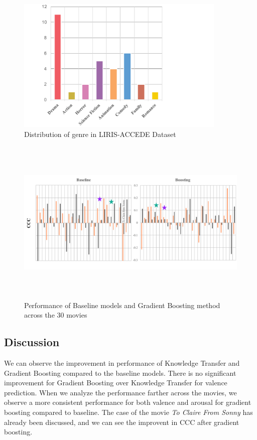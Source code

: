 \documentclass{article}
\begin{document}
\begin{figure}[h]
\includegraphics[width=10cm]{genre}
\centering
\caption{Distribution of genre in LIRIS-ACCEDE Dataset}
\label{genre}
\end{figure}

\begin{figure}[h]
\includegraphics[width=\textwidth, height = 8cm]{comparison}
\centering
\caption{Performance of Baseline models and Gradient Boosting method across the 30 movies}
\label{comparison}
\end{figure}

\subsection{Discussion}
We can observe the improvement in performance of Knowledge Transfer and Gradient Boosting compared to the baseline models. There is no significant improvement for Gradient Boosting over Knowledge Transfer for valence prediction. When we analyze the performance farther across the movies, we observe a more consistent performance for both valence and arousal for gradient boosting compared to baseline. The case of the movie \textit{To Claire From Sonny} has already been discussed, and we can see the improvent in CCC after gradient boosting.
\end{document}
